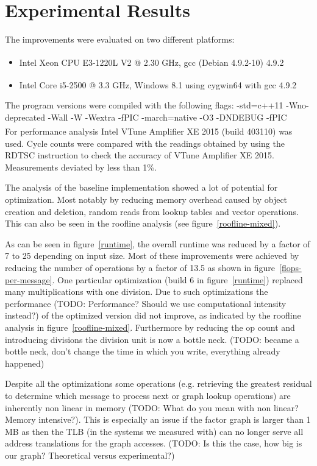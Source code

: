 \section{Experimental Results}\label{sec:results}

 The improvements were evaluated on two different platforms:
\begin{itemize}
\item Intel\textsuperscript{\textregistered} Xeon CPU E3-1220L V2 @ 2.30 GHz, gcc (Debian 4.9.2-10) 4.9.2
\item Intel\textsuperscript{\textregistered} Core i5-2500 @ 3.3 GHz, Windows 8.1 using cygwin64 with gcc 4.9.2
\end{itemize}

The program versions were compiled with the following flags: 
-std=c++11 -Wno-deprecated -Wall -W -Wextra -fPIC -march=native -O3 -DNDEBUG -fPIC
\\
For performance analysis Intel\textsuperscript{\textregistered} VTune Amplifier XE 2015 (build 403110) was used. Cycle counts were compared with the readings obtained by using the RDTSC instruction to check the accuracy of VTune Amplifier XE 2015. Measurements deviated by less than 1\%.

The analysis of the baseline implementation showed a lot of potential for optimization. Most notably by reducing memory overhead caused by object creation and deletion, random reads from lookup tables and vector operations. This can also be seen in the roofline analysis \cite{Ofenbeck:14} (see figure~\ref{roofline-mixed}).

As can be seen in figure~\ref{runtime}, the overall runtime was reduced by a factor of 7 to 25 depending on input size. Most of these improvements were achieved by reducing the number of operations by a factor of 13.5 as shown in figure~\ref{flops-per-message}. One particular optimization (build 6 in figure~\ref{runtime}) replaced many multiplications with one division. Due to such optimizations the performance (TODO: Performance? Should we use computational intensity instead?) of the optimized version did not improve, as indicated by the roofline analysis in figure~\ref{roofline-mixed}. Furthermore by reducing the op count and introducing divisions the division unit is now a bottle neck. (TODO: became a bottle neck, don't change the time in which you write, everything already happened)

Despite all the optimizations some operations (e.g. retrieving the greatest residual to determine which message to process next or graph lookup operations) are inherently non linear in memory (TODO: What do you mean with non linear? Memory intensive?). This is especially an issue if the factor graph is larger than 1 MB as then the TLB (in the systems we measured with) can no longer serve all address translations for the graph accesses. (TODO: Is this the case, how big is our graph? Theoretical versus experimental?)

